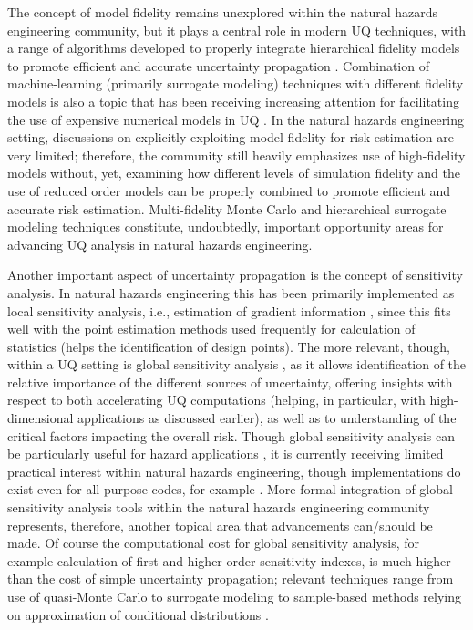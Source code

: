 The concept of model fidelity remains unexplored within the natural hazards engineering community, but it plays a central role in modern UQ techniques, with a range of algorithms developed to properly integrate hierarchical fidelity models to promote efficient and accurate uncertainty propagation \citep{geraci2017multifidelity, peherstorfer2018survey}. Combination of machine-learning (primarily surrogate modeling) techniques with different fidelity models is also a topic that has been receiving increasing attention for facilitating the use of expensive numerical models in UQ \citep{debaar2015uncertainty, zhou2016active}. In the natural hazards engineering setting, discussions on explicitly exploiting model fidelity for risk estimation are very limited; therefore, the community still heavily emphasizes use of high-fidelity models without, yet, examining how different levels of simulation fidelity and the use of reduced order models can be properly combined to promote efficient and accurate risk estimation. Multi-fidelity Monte Carlo and hierarchical surrogate modeling techniques constitute, undoubtedly, important opportunity areas for advancing UQ analysis in natural hazards engineering.

Another important aspect of uncertainty propagation is the concept of sensitivity analysis. In natural hazards engineering this has been primarily implemented as local sensitivity analysis, i.e., estimation of gradient information \citep{haukaas2007methods,gu2009finite},  since this fits well with the point estimation methods used frequently for calculation of statistics (helps the identification of design points). The more relevant, though, within a UQ setting is global sensitivity analysis \citep{sobol1990sensitivity,saltelli2002making,rahman2016fsensitivity}, as it allows identification of the relative importance of the different sources of uncertainty, offering insights with respect to both accelerating UQ computations (helping, in particular, with high-dimensional applications as discussed earlier), as well as to understanding of the critical factors impacting the overall risk. Though global sensitivity analysis can be particularly useful for hazard applications \citep{vetter2012global}, it is currently receiving limited practical interest within natural hazards engineering, though implementations do exist even for all purpose codes, for example \citep{bourinet2009review}. More formal integration of global sensitivity analysis tools within the natural hazards engineering community represents, therefore, another topical area that advancements can/should be made. Of course the computational cost for global sensitivity analysis, for example calculation of first and higher order sensitivity indexes, is much higher than the cost of simple uncertainty propagation; relevant techniques range from use of quasi-Monte Carlo \citep{saltelli2002making} to surrogate modeling \citep{sudret2008global} to sample-based methods relying on approximation of conditional distributions \citep{li2016efficient,hu2019probability}.  

